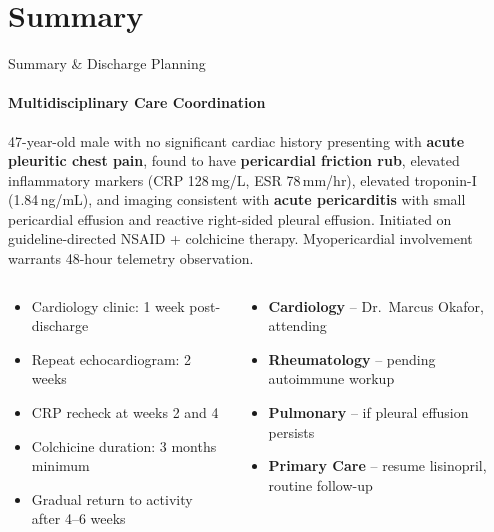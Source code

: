 \documentclass[10pt,aspectratio=169]{beamer}
\begin{document}
\section{Summary}
\begin{frame}{Summary \& Discharge Planning}
  \framesubtitle{Multidisciplinary Care Coordination}

  \begin{tcolorbox}[infobox,title={\faClipboard\hspace{4pt}Case Summary}]
    \small
    47-year-old male with no significant cardiac history presenting with \textbf{acute pleuritic chest pain}, found to have \textbf{pericardial friction rub}, elevated inflammatory markers (CRP 128\,mg/L, ESR 78\,mm/hr), elevated troponin-I (1.84\,ng/mL), and imaging consistent with \textbf{acute pericarditis} with small pericardial effusion and reactive right-sided pleural effusion. Initiated on guideline-directed NSAID + colchicine therapy. Myopericardial involvement warrants 48-hour telemetry observation.
  \end{tcolorbox}

  \vspace{0.3cm}

  \begin{columns}[T]
    \begin{tcolorbox}[highlightbox,title={\faCalendar\hspace{4pt}Follow-Up Plan}]
      \small
      \begin{itemize}
        \item Cardiology clinic: 1 week post-discharge
        \item Repeat echocardiogram: 2 weeks
        \item CRP recheck at weeks 2 and 4
        \item Colchicine duration: 3 months minimum
        \item Gradual return to activity after 4--6 weeks
      \end{itemize}
    \end{tcolorbox}

    \begin{tcolorbox}[infobox,title={\faUserMd\hspace{4pt}Consulting Services}]
      \small
      \begin{itemize}
        \item \textbf{Cardiology} -- Dr.\ Marcus Okafor, attending
        \item \textbf{Rheumatology} -- pending autoimmune workup
        \item \textbf{Pulmonary} -- if pleural effusion persists
        \item \textbf{Primary Care} -- resume lisinopril, routine follow-up
      \end{itemize}
    \end{tcolorbox}
  \end{columns}


\end{frame}
\end{document}
